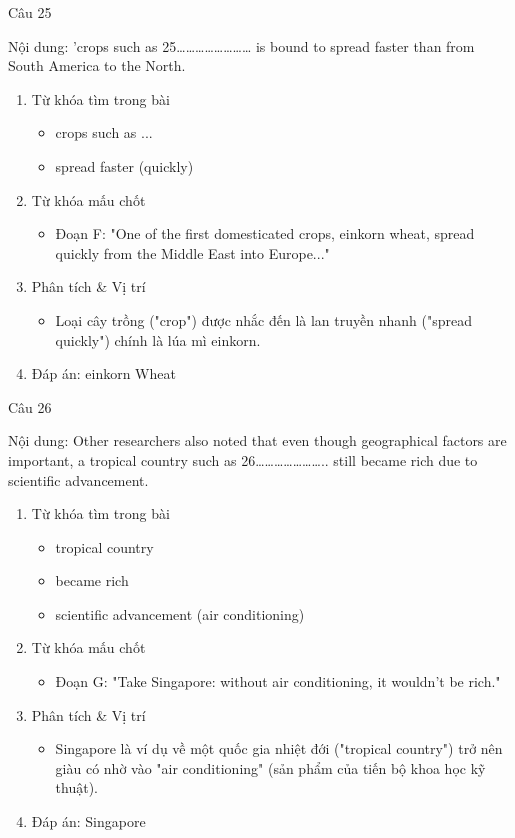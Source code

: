 \documentclass{../templateReading/cdreading}
\begin{document}
Câu 25

Nội dung: ’crops such as 25…………………… is bound to spread faster than from South America to the North.
\begin{enumerate}
\item Từ khóa tìm trong bài
\begin{itemize}
\item crops such as ...
\item spread faster (quickly)
\end{itemize}
\item Từ khóa mấu chốt
\begin{itemize}
\item Đoạn F: "One of the first domesticated crops, einkorn wheat, spread quickly from the Middle East into Europe..."
\end{itemize}
\item Phân tích \& Vị trí
\begin{itemize}
\item Loại cây trồng ("crop") được nhắc đến là lan truyền nhanh ("spread quickly") chính là lúa mì einkorn.
\end{itemize}
\item Đáp án: einkorn Wheat
\end{enumerate}

Câu 26

Nội dung: Other researchers also noted that even though geographical factors are important, a tropical country such as 26………………….. still became rich due to scientific advancement.
\begin{enumerate}
\item Từ khóa tìm trong bài
\begin{itemize}
\item tropical country
\item became rich
\item scientific advancement (air conditioning)
\end{itemize}
\item Từ khóa mấu chốt
\begin{itemize}
\item Đoạn G: "Take Singapore: without air conditioning, it wouldn’t be rich."
\end{itemize}
\item Phân tích \& Vị trí
\begin{itemize}
\item Singapore là ví dụ về một quốc gia nhiệt đới ("tropical country") trở nên giàu có nhờ vào "air conditioning" (sản phẩm của tiến bộ khoa học kỹ thuật).
\end{itemize}
\item Đáp án: Singapore
\end{enumerate}
\end{document}

